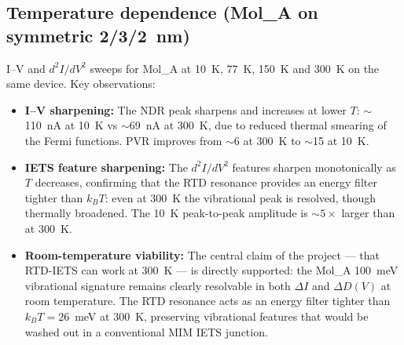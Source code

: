 \documentclass[11pt,a4paper,onecolumn]{article}
\begin{document}
\subsection{Temperature dependence (Mol\_A on symmetric 2/3/2~nm)}
\label{sec:results-temp}
I--V and $d^2I/dV^2$ sweeps for Mol\_A at 10~K, 77~K, 150~K and 300~K on the same
device. Key observations:
\begin{itemize}[leftmargin=1.3em,itemsep=0pt]
\item \textbf{I--V sharpening:} The NDR peak sharpens and increases at lower
$T$: $\sim$110~nA at 10~K vs $\sim$69~nA at 300~K, due to reduced thermal
smearing of the Fermi functions. PVR improves from $\sim$6 at 300~K to
$\sim$15 at 10~K.
\item \textbf{IETS feature sharpening:} The $d^2I/dV^2$ features
sharpen monotonically as $T$ decreases, confirming that the RTD resonance
provides an energy filter tighter than $k_BT$: even at 300~K the vibrational
peak is resolved, though thermally broadened. The 10~K peak-to-peak
amplitude is $\sim 5\times$ larger than at 300~K.
\item \textbf{Room-temperature viability:} The central claim of the project
--- that RTD-IETS can work at 300~K --- is directly supported: the Mol\_A
100~meV vibrational signature remains clearly resolvable in both $\Delta I$
and $\Delta D(V)$ at room temperature. The RTD resonance acts as an energy
filter tighter than $k_BT = 26$~meV at 300~K, preserving vibrational
features that would be washed out in a conventional MIM IETS junction.
\end{itemize}
\end{document}
